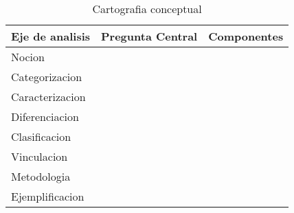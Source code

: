 \begin{table}[!h]
   \caption{Cartografia conceptual}
   \begin{tabular}{p{4cm}|p{4cm}|p{4cm}}
      Eje de analisis & Pregunta Central & Componentes\\
      \hline
      Nocion & &\\
      Categorizacion & &\\
      Caracterizacion & &\\
      Diferenciacion & &\\
      Clasificacion & &\\
      Vinculacion & &\\
      Metodologia & &\\
      Ejemplificacion & &\\
      \hline
   \end{tabular}
\end{table}
